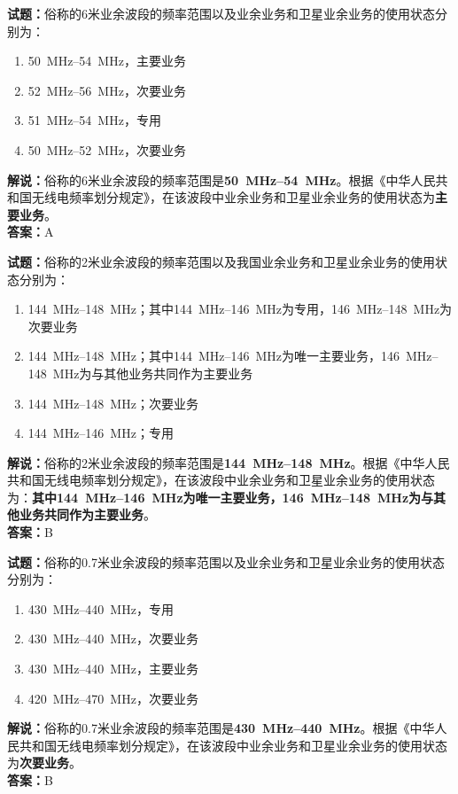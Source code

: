 \documentclass{ctexbook}
\begin{document}
\bigskip

\noindent\textbf{试题：}俗称的6米业余波段的频率范围以及业余业务和卫星业余业务的使用状态分别为：
\begin{enumerate}[leftmargin=3em]
  \item \qtyrange[range-phrase=--]{50}{54}{\MHz}，主要业务
  \item \qtyrange[range-phrase=--]{52}{56}{\MHz}，次要业务
  \item \qtyrange[range-phrase=--]{51}{54}{\MHz}，专用
  \item \qtyrange[range-phrase=--]{50}{52}{\MHz}，次要业务
\end{enumerate}
\noindent\textbf{解说：}俗称的6米业余波段的频率范围是\textbf{\qtyrange[range-phrase=--]{50}{54}{\MHz}}。根据《中华人民共和国无线电频率划分规定》，在该波段中业余业务和卫星业余业务的使用状态为\textbf{主要业务}。\\\noindent\textbf{答案：}A

\bigskip

\noindent\textbf{试题：}俗称的2米业余波段的频率范围以及我国业余业务和卫星业余业务的使用状态分别为：
\begin{enumerate}[leftmargin=3em]
  \item \qtyrange[range-phrase=--]{144}{148}{\MHz}；其中\qtyrange[range-phrase=--]{144}{146}{\MHz}为专用，\qtyrange[range-phrase=--]{146}{148}{\MHz}为次要业务
  \item \qtyrange[range-phrase=--]{144}{148}{\MHz}；其中\qtyrange[range-phrase=--]{144}{146}{\MHz}为唯一主要业务，\qtyrange[range-phrase=--]{146}{148}{\MHz}为与其他业务共同作为主要业务
  \item \qtyrange[range-phrase=--]{144}{148}{\MHz}；次要业务
  \item \qtyrange[range-phrase=--]{144}{146}{\MHz}；专用
\end{enumerate}
\noindent\textbf{解说：}俗称的2米业余波段的频率范围是\textbf{\qtyrange[range-phrase=--]{144}{148}{\MHz}}。根据《中华人民共和国无线电频率划分规定》，在该波段中业余业务和卫星业余业务的使用状态为：\textbf{其中\qtyrange[range-phrase=--]{144}{146}{\MHz}为唯一主要业务，\qtyrange[range-phrase=--]{146}{148}{\MHz}为与其他业务共同作为主要业务}。\\\noindent\textbf{答案：}B

\bigskip

\noindent\textbf{试题：}俗称的0.7米业余波段的频率范围以及业余业务和卫星业余业务的使用状态分别为：
\begin{enumerate}[leftmargin=3em]
  \item \qtyrange[range-phrase=--]{430}{440}{\MHz}，专用
  \item \qtyrange[range-phrase=--]{430}{440}{\MHz}，次要业务
  \item \qtyrange[range-phrase=--]{430}{440}{\MHz}，主要业务
  \item \qtyrange[range-phrase=--]{420}{470}{\MHz}，次要业务
\end{enumerate}
\noindent\textbf{解说：}俗称的0.7米业余波段的频率范围是\textbf{\qtyrange[range-phrase=--]{430}{440}{\MHz}}。根据《中华人民共和国无线电频率划分规定》，在该波段中业余业务和卫星业余业务的使用状态为\textbf{次要业务}。\\\noindent\textbf{答案：}B
\end{document}
